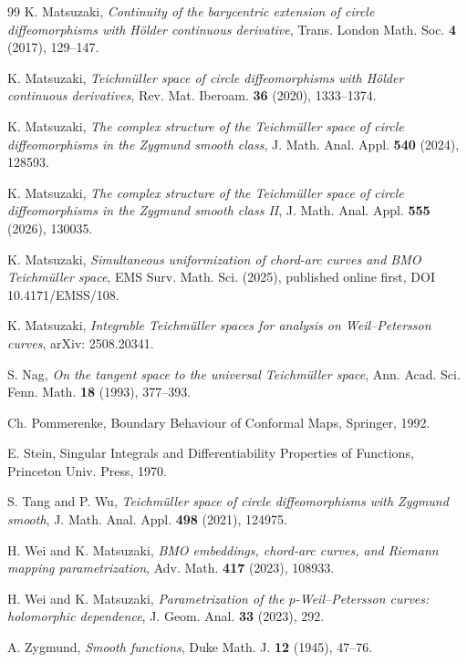 \documentclass[amstex]{amsart}
\theoremstyle{definition}
\theoremstyle{remark}
\numberwithin{equation}{section}
\begin{document}
\begin{thebibliography}{99}
K. Matsuzaki, {\it Continuity of the barycentric extension of circle diffeomorphisms
with H\"older continuous derivative}, Trans. London Math. Soc. {\bf 4} (2017), 129--147.

K. Matsuzaki, {\it Teich\-m\"ul\-ler space of circle diffeomorphisms with H\"older continuous derivatives}, Rev. Mat. Iberoam. {\bf 36} (2020), 1333--1374.  

K. Matsuzaki, 
{\it The complex structure of the Teichm\"uller space of circle diffeomorphisms in the Zygmund smooth class},
J. Math. Anal. Appl. {\bf 540} (2024), 128593. 

K. Matsuzaki, 
{\it The complex structure of the Teichm\"uller space of circle diffeomorphisms in the Zygmund smooth class II},
J. Math. Anal. Appl. {\bf 555} (2026), 130035. 

K. Matsuzaki, 
{\it Simultaneous uniformization of chord-arc curves and BMO Teich\-m\"uller space},
EMS Surv. Math. Sci. (2025), published online first, DOI 10.4171/EMSS/108.

K. Matsuzaki,
{\it Integrable Teichm\"uller spaces for analysis on Weil--Petersson curves}, arXiv: 2508.20341.

 S. Nag, {\it On the tangent space to the universal Teichm\"uller space}, Ann. Acad. Sci.
Fenn. Math. {\bf 18} (1993), 377--393.

 Ch. Pommerenke, Boundary Behaviour of Conformal Maps, Springer, 1992.

 E. Stein, Singular Integrals and Differentiability Properties of Functions, Princeton Univ. Press, 1970. 

 S. Tang and P. Wu,
{\it Teich\-m\"ul\-ler space of circle diffeomorphisms with Zygmund smooth},
J. Math. Anal. Appl. {\bf 498} (2021), 124975. 

 H. Wei and K. Matsuzaki, {\it BMO embeddings, chord-arc curves, and Riemann mapping parametrization},
Adv. Math. {\bf 417} (2023), 108933.

 H. Wei and K. Matsuzaki, {\it Parametrization of the $p$-Weil--Petersson curves:
holomorphic dependence}, J. Geom. Anal. {\bf 33} (2023), 292.

 A. Zygmund, {\it Smooth functions}, Duke Math. J. {\bf 12} (1945), 47--76. 

\end{thebibliography}
\end{document}
